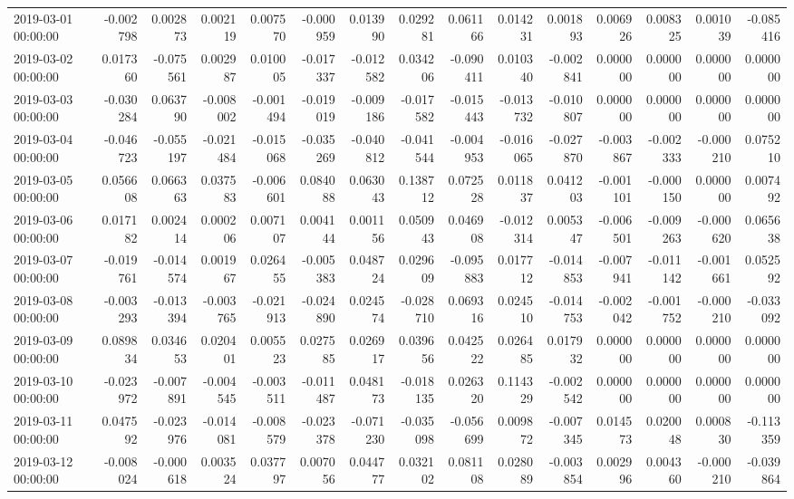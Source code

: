 \begin{tabular}{lrrrrrrrrrrrrrr}
2019-03-01 00:00:00 & -0.002798 & 0.002873 & 0.002119 & 0.007570 & -0.000959 & 0.013990 & 0.029281 & 0.061166 & 0.014231 & 0.001893 & 0.006926 & 0.008325 & 0.001039 & -0.085416 \\
2019-03-02 00:00:00 & 0.017360 & -0.075561 & 0.002987 & 0.010005 & -0.017337 & -0.012582 & 0.034206 & -0.090411 & 0.010340 & -0.002841 & 0.000000 & 0.000000 & 0.000000 & 0.000000 \\
2019-03-03 00:00:00 & -0.030284 & 0.063790 & -0.008002 & -0.001494 & -0.019019 & -0.009186 & -0.017582 & -0.015443 & -0.013732 & -0.010807 & 0.000000 & 0.000000 & 0.000000 & 0.000000 \\
2019-03-04 00:00:00 & -0.046723 & -0.055197 & -0.021484 & -0.015068 & -0.035269 & -0.040812 & -0.041544 & -0.004953 & -0.016065 & -0.027870 & -0.003867 & -0.002333 & -0.000210 & 0.075210 \\
2019-03-05 00:00:00 & 0.056608 & 0.066363 & 0.037583 & -0.006601 & 0.084088 & 0.063043 & 0.138712 & 0.072528 & 0.011837 & 0.041203 & -0.001101 & -0.000150 & 0.000000 & 0.007492 \\
2019-03-06 00:00:00 & 0.017182 & 0.002414 & 0.000206 & 0.007107 & 0.004144 & 0.001156 & 0.050943 & 0.046908 & -0.012314 & 0.005347 & -0.006501 & -0.009263 & -0.000620 & 0.065638 \\
2019-03-07 00:00:00 & -0.019761 & -0.014574 & 0.001967 & 0.026455 & -0.005383 & 0.048724 & 0.029609 & -0.095883 & 0.017712 & -0.014853 & -0.007941 & -0.011142 & -0.001661 & 0.052592 \\
2019-03-08 00:00:00 & -0.003293 & -0.013394 & -0.003765 & -0.021913 & -0.024890 & 0.024574 & -0.028710 & 0.069316 & 0.024510 & -0.014753 & -0.002042 & -0.001752 & -0.000210 & -0.033092 \\
2019-03-09 00:00:00 & 0.089834 & 0.034653 & 0.020401 & 0.005523 & 0.027585 & 0.026917 & 0.039656 & 0.042522 & 0.026485 & 0.017932 & 0.000000 & 0.000000 & 0.000000 & 0.000000 \\
2019-03-10 00:00:00 & -0.023972 & -0.007891 & -0.004545 & -0.003511 & -0.011487 & 0.048173 & -0.018135 & 0.026320 & 0.114329 & -0.002542 & 0.000000 & 0.000000 & 0.000000 & 0.000000 \\
2019-03-11 00:00:00 & 0.047592 & -0.023976 & -0.014081 & -0.008579 & -0.023378 & -0.071230 & -0.035098 & -0.056699 & 0.009872 & -0.007345 & 0.014573 & 0.020048 & 0.000830 & -0.113359 \\
2019-03-12 00:00:00 & -0.008024 & -0.000618 & 0.003524 & 0.037797 & 0.007056 & 0.044777 & 0.032102 & 0.081108 & 0.028089 & -0.003854 & 0.002996 & 0.004360 & -0.000210 & -0.039864 \\

\end{tabular}
